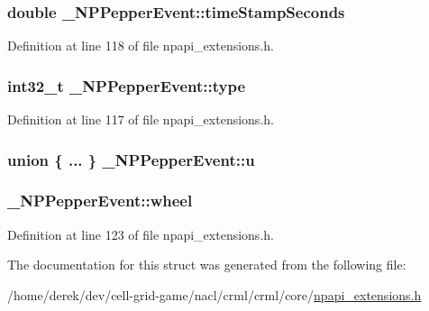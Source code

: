 \hypertarget{struct___n_p_pepper_event_a1792505a7022b4d29d567c7ba474aa8c}{
\subsubsection[{timeStampSeconds}]{\setlength{\rightskip}{0pt plus 5cm}double {\bf \_\-NPPepperEvent::timeStampSeconds}}}
\label{struct___n_p_pepper_event_a1792505a7022b4d29d567c7ba474aa8c}


Definition at line 118 of file npapi\_\-extensions.h.

\hypertarget{struct___n_p_pepper_event_a12e186ade338a56a93d852bdad6f5c7a}{
\subsubsection[{type}]{\setlength{\rightskip}{0pt plus 5cm}int32\_\-t {\bf \_\-NPPepperEvent::type}}}
\label{struct___n_p_pepper_event_a12e186ade338a56a93d852bdad6f5c7a}


Definition at line 117 of file npapi\_\-extensions.h.

\hypertarget{struct___n_p_pepper_event_a0b3d13b8bf33be03ad0d9f710a54d423}{
\subsubsection[{u}]{\setlength{\rightskip}{0pt plus 5cm}union \{ ... \}   {\bf \_\-NPPepperEvent::u}}}
\label{struct___n_p_pepper_event_a0b3d13b8bf33be03ad0d9f710a54d423}
\hypertarget{struct___n_p_pepper_event_a8ed6a3d4515f83b58e79c6780a28827f}{
\subsubsection[{wheel}]{ {\bf \_\-NPPepperEvent::wheel}}}
\label{struct___n_p_pepper_event_a8ed6a3d4515f83b58e79c6780a28827f}


Definition at line 123 of file npapi\_\-extensions.h.



The documentation for this struct was generated from the following file:\begin{DoxyCompactItemize}
\item 
/home/derek/dev/cell-\/grid-\/game/nacl/crml/crml/core/\hyperlink{npapi__extensions_8h}{npapi\_\-extensions.h}\end{DoxyCompactItemize}
